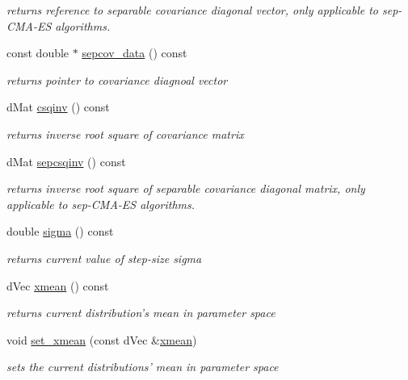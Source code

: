 \begin{DoxyCompactItemize}
\begin{DoxyCompactList}\small\item\em returns reference to separable covariance diagonal vector, only applicable to sep-\/\-C\-M\-A-\/\-E\-S algorithms. \end{DoxyCompactList}\item 
const double $\ast$ \hyperlink{classlibcmaes_1_1CMASolutions_a66c5167b418f84fbdfc91735bf573bdb}{sepcov\-\_\-data} () const 
\begin{DoxyCompactList}\small\item\em returns pointer to covariance diagnoal vector \end{DoxyCompactList}\item 
d\-Mat \hyperlink{classlibcmaes_1_1CMASolutions_a702e38431816384b0378e7b9b198e3f3}{csqinv} () const 
\begin{DoxyCompactList}\small\item\em returns inverse root square of covariance matrix \end{DoxyCompactList}\item 
d\-Mat \hyperlink{classlibcmaes_1_1CMASolutions_afc21a4719c268edd6a67a28c5a7f16ff}{sepcsqinv} () const 
\begin{DoxyCompactList}\small\item\em returns inverse root square of separable covariance diagonal matrix, only applicable to sep-\/\-C\-M\-A-\/\-E\-S algorithms. \end{DoxyCompactList}\item 
double \hyperlink{classlibcmaes_1_1CMASolutions_a8790ac429e629856d2295e953cbe2324}{sigma} () const 
\begin{DoxyCompactList}\small\item\em returns current value of step-\/size sigma \end{DoxyCompactList}\item 
d\-Vec \hyperlink{classlibcmaes_1_1CMASolutions_ab8d63d0079eff716421f82a8ec874ca4}{xmean} () const 
\begin{DoxyCompactList}\small\item\em returns current distribution's mean in parameter space \end{DoxyCompactList}\item 
void \hyperlink{classlibcmaes_1_1CMASolutions_a743993dedaaf9adc7cb60cb65e584721}{set\-\_\-xmean} (const d\-Vec \&\hyperlink{classlibcmaes_1_1CMASolutions_ab8d63d0079eff716421f82a8ec874ca4}{xmean})
\begin{DoxyCompactList}\small\item\em sets the current distributions' mean in parameter space \end{DoxyCompactList}\item 

\end{DoxyCompactItemize}
